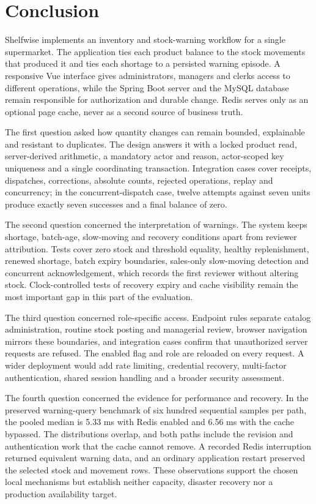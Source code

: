 \chapter*{Conclusion}


Shelfwise implements an inventory and stock-warning workflow for a single supermarket. The application ties each product balance to the stock movements that produced it and ties each shortage to a persisted warning episode. A responsive Vue interface gives administrators, managers and clerks access to different operations, while the Spring Boot server and the MySQL database remain responsible for authorization and durable change. Redis serves only as an optional page cache, never as a second source of business truth.


The first question asked how quantity changes can remain bounded, explainable and resistant to duplicates. The design answers it with a locked product read, server-derived arithmetic, a mandatory actor and reason, actor-scoped key uniqueness and a single coordinating transaction. Integration cases cover receipts, dispatches, corrections, absolute counts, rejected operations, replay and concurrency; in the concurrent-dispatch case, twelve attempts against seven units produce exactly seven successes and a final balance of zero.


The second question concerned the interpretation of warnings. The system keeps shortage, batch-age, slow-moving and recovery conditions apart from reviewer attribution. Tests cover zero stock and threshold equality, healthy replenishment, renewed shortage, batch expiry boundaries, sales-only slow-moving detection and concurrent acknowledgement, which records the first reviewer without altering stock. Clock-controlled tests of recovery expiry and cache visibility remain the most important gap in this part of the evaluation.


The third question concerned role-specific access. Endpoint rules separate catalog administration, routine stock posting and managerial review, browser navigation mirrors these boundaries, and integration cases confirm that unauthorized server requests are refused. The enabled flag and role are reloaded on every request. A wider deployment would add rate limiting, credential recovery, multi-factor authentication, shared session handling and a broader security assessment.


The fourth question concerned the evidence for performance and recovery. In the preserved warning-query benchmark of six hundred sequential samples per path, the pooled median is 5.33 ms with Redis enabled and 6.56 ms with the cache bypassed. The distributions overlap, and both paths include the revision and authentication work that the cache cannot remove. A recorded Redis interruption returned equivalent warning data, and an ordinary application restart preserved the selected stock and movement rows. These observations support the chosen local mechanisms but establish neither capacity, disaster recovery nor a production availability target.


